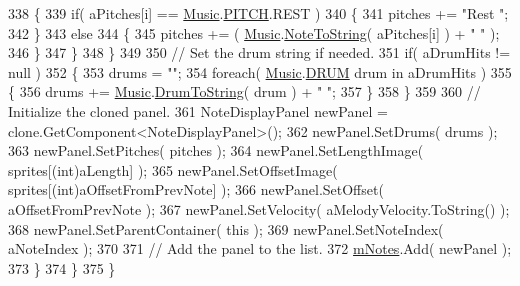 \begin{DoxyCode}
338                         \{
339                             \textcolor{keywordflow}{if}( aPitches[i] == \hyperlink{class_music}{Music}.\hyperlink{group___music_enums_ga508f69b199ea518f935486c990edac1d}{PITCH}.REST )
340                             \{
341                                 pitches += \textcolor{stringliteral}{"Rest "};
342                             \}
343                             \textcolor{keywordflow}{else}
344                             \{
345                                 pitches += ( \hyperlink{class_music}{Music}.\hyperlink{group___music_stat_func_ga85a22c905d56d4c5f4e62159bfecee8c}{NoteToString}( aPitches[i] ) + \textcolor{stringliteral}{" "} );
346                             \}
347                         \}
348                     \}
349 
350                     \textcolor{comment}{// Set the drum string if needed.}
351                     \textcolor{keywordflow}{if}( aDrumHits != null )
352                     \{
353                         drums = \textcolor{stringliteral}{""};
354                         \textcolor{keywordflow}{foreach}( \hyperlink{class_music}{Music}.\hyperlink{group___music_enums_gade475b4382c7066d1af13e7c13c029b6}{DRUM} drum in aDrumHits )
355                         \{
356                             drums += \hyperlink{class_music}{Music}.\hyperlink{group___music_stat_func_gaf5f64ebe9a7e036e07f283e41f26d22b}{DrumToString}( drum ) + \textcolor{stringliteral}{" "};
357                         \}
358                     \}
359 
360                     \textcolor{comment}{// Initialize the cloned panel.}
361                     NoteDisplayPanel newPanel = clone.GetComponent<NoteDisplayPanel>();
362                     newPanel.SetDrums( drums );
363                     newPanel.SetPitches( pitches );
364                     newPanel.SetLengthImage( sprites[(\textcolor{keywordtype}{int})aLength] );
365                     newPanel.SetOffsetImage( sprites[(\textcolor{keywordtype}{int})aOffsetFromPrevNote] );
366                     newPanel.SetOffset( aOffsetFromPrevNote );
367                     newPanel.SetVelocity( aMelodyVelocity.ToString() );
368                     newPanel.SetParentContainer( \textcolor{keyword}{this} );
369                     newPanel.SetNoteIndex( aNoteIndex );
370 
371                     \textcolor{comment}{// Add the panel to the list.}
372                     \hyperlink{class_song_creation_1_1_measure_display_panel_a096dfc8481f3defcdcb57bfc140ac953}{mNotes}.Add( newPanel );
373                 \}
374             \}
375         \}
\end{DoxyCode}
\mbox{\label{class_song_creation_1_1_measure_display_panel_ad38f91e55d3c37e520a35a2a0e620b42}} 
